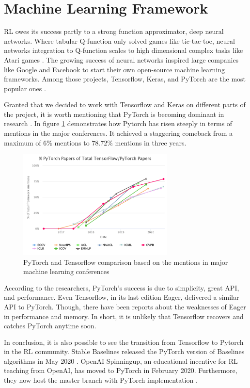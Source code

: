 \section{Machine Learning Framework}


RL owes its success partly to a strong function approximator, deep neural networks. Where tabular Q-function only solved games like tic-tac-toe, neural networks integration to Q-function scales to high dimensional complex tasks like Atari games \cite{Mnih}. The growing success of neural networks inspired large companies like Google and Facebook to start their own open-source machine learning frameworks. Among those projects, Tensorflow, Keras, and PyTorch are the most popular ones \cite{Tensoflow} \cite{Keras} \cite{PyTorch}. 

Granted that we decided to work with Tensorflow and Keras on different parts of the project, it is worth mentioning that PyTorch is becoming dominant in research \cite{Horace}. In figure \ref{fig:ptvstf} demonstrates how Pytorch has risen steeply in terms of mentions in the major conferences. It achieved a staggering comeback from a maximum of \(6\%\) mentions to \(78.72\%\) mentions in three years.  

\begin{figure}[htbp] 
    \centering
    \includegraphics[width=0.7\textwidth]{figures/tfvspytorch}
    \caption{PyTorch and Tensorflow comparison based on the mentions in major machine learning conferences \cite{Horace}}
    \label{fig:ptvstf}
\end{figure}


According to the researchers, PyTorch’s success is due to simplicity, great API, and performance. Even Tensorflow, in its last edition Eager, delivered a similar API to PyTorch. Though, there have been reports about the weaknesses of Eager in performance and memory. In short, it is unlikely that Tensorflow recovers and catches PyTorch anytime soon.

In conclusion, it is also possible to see the transition from Tensorflow to Pytorch in the RL community. Stable Baselines released the PyTorch version of Baselines algorithms in May 2020 \cite{stable-baselines3}. OpenAI Spinningup, an educational incentive for RL teaching from OpenAI, has moved to PyTorch in February 2020. Furthermore, they now host the master branch with PyTorch implementation \cite{SpinningUp2018}.

 
